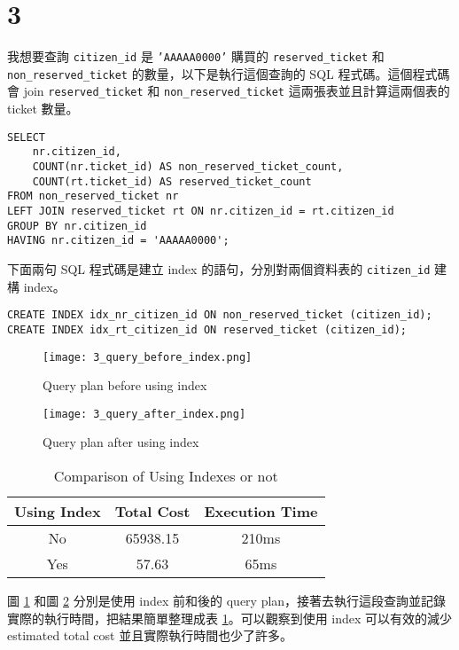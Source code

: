 \documentclass{article}
\begin{document}
\section*{3}
我想要查詢 \texttt{citizen\_id} 是 \texttt{'AAAAA0000'} 購買的 \texttt{reserved\_ticket} 和 \texttt{non\_reserved\_ticket} 的數量，以下是執行這個查詢的 SQL 程式碼。這個程式碼會 join \texttt{reserved\_ticket} 和 \texttt{non\_reserved\_ticket} 這兩張表並且計算這兩個表的 ticket 數量。
\begin{verbatim}
SELECT 
    nr.citizen_id,
    COUNT(nr.ticket_id) AS non_reserved_ticket_count,
    COUNT(rt.ticket_id) AS reserved_ticket_count
FROM non_reserved_ticket nr
LEFT JOIN reserved_ticket rt ON nr.citizen_id = rt.citizen_id
GROUP BY nr.citizen_id
HAVING nr.citizen_id = 'AAAAA0000';
\end{verbatim}
下面兩句 SQL 程式碼是建立 index 的語句，分別對兩個資料表的 \texttt{citizen\_id} 建構 index。
\begin{verbatim}
CREATE INDEX idx_nr_citizen_id ON non_reserved_ticket (citizen_id);
CREATE INDEX idx_rt_citizen_id ON reserved_ticket (citizen_id);
\end{verbatim}

\begin{figure}[H]
    \centering
    \texttt{[image: 3\_query\_before\_index.png]}
    \caption{Query plan before using index}
    \label{fig:3_before}
\end{figure}

\begin{figure}[H]
    \centering
    \texttt{[image: 3\_query\_after\_index.png]}
    \caption{Query plan after using index}
    \label{fig:3_after}
\end{figure}

\begin{table}[H]
    \centering
    \begin{tabular}{ccc}
        \toprule
        \textbf{Using Index} & \textbf{Total Cost} & \textbf{Execution Time} \\
        \midrule
        No & 65938.15 & 210ms\\
        Yes & 57.63 & 65ms \\
        \bottomrule
    \end{tabular}
    \caption{Comparison of Using Indexes or not}
    \label{tab:3}
\end{table}
圖 \ref{fig:3_before} 和圖 \ref{fig:3_after} 分別是使用 index 前和後的 query plan，接著去執行這段查詢並記錄實際的執行時間，把結果簡單整理成表 \ref{tab:3}。可以觀察到使用 index 可以有效的減少 estimated total cost 並且實際執行時間也少了許多。
\end{document}
